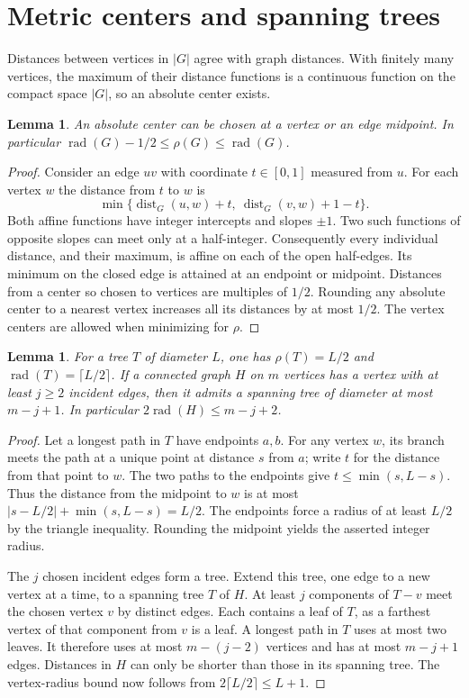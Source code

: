\documentclass[11pt,a4paper]{article}
\newtheorem{lemma}[theorem]{Lemma}\newtheorem{corollary}[theorem]{Corollary}
\newcommand{\rad}{\operatorname{rad}}\newcommand{\diam}{\operatorname{diam}}
\newcommand{\dist}{\operatorname{dist}}\newcommand{\ecc}{\operatorname{ecc}}
\begin{document}
\section{Metric centers and spanning trees}\label{p03-sec:metric}
Distances between vertices in $|G|$ agree with graph distances. With
finitely many vertices, the maximum of their distance functions is a
continuous function on the compact space $|G|$, so an absolute center
exists.
\begin{lemma}\label{p03-lem:half}
An absolute center can be chosen at a vertex or an edge midpoint.
In particular $\rad(G)-1/2\le\rho(G)\le\rad(G)$.
\end{lemma}
\begin{proof}
Consider an edge $uv$ with coordinate $t\in[0,1]$ measured from $u$.
For each vertex $w$ the distance from $t$ to $w$ is
\[
 \min\{\dist_G(u,w)+t,\ \dist_G(v,w)+1-t\}.
\]
Both affine functions have integer intercepts and slopes $\pm1$. Two
such functions of opposite slopes can meet only at a half-integer.
Consequently every individual distance, and their maximum, is affine
on each of the open half-edges. Its minimum on the closed edge is
attained at an endpoint or midpoint. Distances from a center so chosen
to vertices are multiples of $1/2$. Rounding any absolute center to a
nearest vertex increases all its distances by at most $1/2$. The vertex
centers are allowed when minimizing for $\rho$.
\end{proof}
\begin{lemma}\label{p03-lem:tree}
For a tree $T$ of diameter $L$, one has $\rho(T)=L/2$ and
$\rad(T)=\lceil L/2\rceil$. If a connected graph $H$ on $m$ vertices
has a vertex with at least $j\ge2$ incident edges, then it admits a
spanning tree of diameter at most $m-j+1$. In particular
$2\rad(H)\le m-j+2$.
\end{lemma}
\begin{proof}
Let a longest path in $T$ have endpoints $a,b$. For any vertex $w$, its
branch meets the path at a unique point at distance $s$ from $a$; write
$t$ for the distance from that point to $w$. The two paths to the
endpoints give $t\le\min(s,L-s)$. Thus the distance from the midpoint
to $w$ is at most $|s-L/2|+\min(s,L-s)=L/2$. The endpoints force a
radius of at least $L/2$ by the triangle inequality. Rounding the
midpoint yields the asserted integer radius.

The $j$ chosen incident edges form a tree. Extend this tree, one edge
to a new vertex at a time, to a spanning tree $T$ of $H$. At least $j$
components of $T-v$ meet the chosen vertex $v$ by distinct edges.
Each contains a leaf of $T$, as a farthest vertex of that component
from $v$ is a leaf. A longest path in $T$ uses at most two leaves. It
therefore uses at most $m-(j-2)$ vertices and has at most $m-j+1$ edges.
Distances in $H$ can only be shorter than those in its spanning tree.
The vertex-radius bound now follows from $2\lceil L/2\rceil\le L+1$.
\end{proof}
\end{document}
